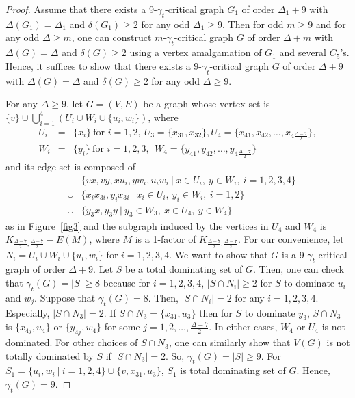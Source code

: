 \documentclass[12pt]{amsart}
\begin{document}
\begin{proof}
Assume that there exists a $9$-$\gamma_{t}$-critical graph $G_1$ of order $\Delta_1 +9$ with $\Delta(G_1)=\Delta_1$ and $\delta(G_1) \ge 2$ for any odd $\Delta_1 \ge 9$. Then for odd $m \ge 9$ and for any odd $\Delta \ge
m$, one can construct $m$-$\gamma_{t}$-critical graph $G$ of order $\Delta +m$ with $\Delta(G)=\Delta$ and $\delta(G) \ge 2$ using a vertex amalgamation of $G_1$ and several $C_5$'s. Hence, it suffices to show that there exists a $9$-$\gamma_{t}$-critical graph $G$ of order $\Delta +9$ with $\Delta(G)=\Delta$ and $\delta(G) \ge 2$ for any odd $\Delta \ge 9$.

For any $\Delta \ge 9$, let $G=(V,E)$ be a graph whose vertex set is $\{v\} \cup \bigcup_{i=1}^{4}\left(U_i \cup W_i \cup \{u_i, w_i \} \right)$, where
 \begin{eqnarray*}
 U_i &=& \{ x_i \} ~\mbox{for $i=1,2$},~U_3=\{ x_{3 1}, x_{3 2} \}, U_4 = \{ x_{4 1}, x_{4 2}, \ldots, x_{4 \frac{\Delta-7}{2}} \}, \\
 W_i &=& \{ y_i \} ~\mbox{for $i=1,2,3$},~~ W_4 = \{ y_{4 1}, y_{4 2}, \ldots, y_{4 \frac{\Delta-7}{2}} \}
 \end{eqnarray*}
   and its edge set is composed of
   \begin{eqnarray*} & & \{ v x, v y, xu_i, yw_i, u_iw_i \ | \ x \in U_i ,\  y \in W_i,~i=1,2,3,4 \}  \\
& \cup & \{x_ix_{3 i}, y_ix_{3 i} \ | \ x_i \in U_i ,\  y_i \in W_i,~i=1,2 \}  \\
& \cup & \{y_3x, y_3y \ | \ y_3 \in W_3 ,\  x \in U_4 ,\ y \in W_4 \} \end{eqnarray*} as in Figure~\ref{fig3} and the subgraph induced by the vertices in $U_4$ and $W_4$
 is $K_{\frac{\Delta-7}{2},  \frac{\Delta-7}{2}}-E(M)$, where $M$ is a 1-factor of $K_{\frac{\Delta-7}{2},  \frac{\Delta-7}{2}}$.
 For our convenience, let $N_i = U_i \cup W_i \cup \{ u_i, w_i \}$ for $i=1,2,3,4$.  We want to show that $G$ is a 9-$\gamma_t$-critical graph of order $\Delta + 9$. Let $S$ be a total dominating set of $G$. Then, one can check that $\gamma_t(G) = |S| \ge 8$  because for $i=1,2,3,4$, $|S \cap N_i | \ge 2$ for $S$ to dominate $u_i$ and $w_j$. Suppose that $\gamma_t(G) = 8$. Then,  $|S \cap N_i | = 2$ for any $i=1,2,3,4$. Especially, $|S\cap N_3|=2$. If $S\cap N_3 = \{ x_{3 1}, u_3 \}$ then for $S$ to dominate $y_3$, $S \cap N_3$ is $\{x_{4 j}, u_4 \}$ or $\{y_{4 j}, w_4 \}$ for some $j=1,2, \ldots,\frac{\Delta-7}{2}$. In either cases, $W_4$ or $U_4$ is not dominated. For other choices of $S\cap N_3$, one can similarly show that $V(G)$ is not totally dominated by $S$ if $|S \cap N_3|=2$. So, $\gamma_t(G) = |S| \ge 9$. For $S_1 =\{u_i, w_i \ | \ i=1,2,4 \} \cup \{v, x_{3 1}, u_3 \}$, $S_1$ is total dominating set of $G$. Hence, $\gamma_t(G)=9$.


\end{proof}
\end{document}
